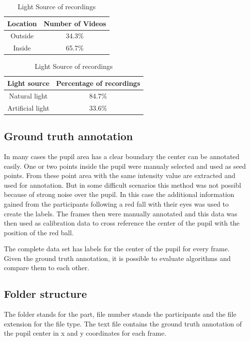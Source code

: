     \begin{table}[h]
      \centering 
      \begin{minipage}{0.7\textwidth}
        \centering
        \begin{tabular}{|c|c|}
          \hline
          Location & Number of Videos \\
          \hline
          Outside & 34.3\% \\
          Inside & 65.7\% \\
          \hline
        \end{tabular}
        \caption{Location of recordings}
        \label{tab:location}
      \end{minipage}\hfill
      \begin{minipage}{0.7\textwidth}
        \centering
        \begin{tabular}{|c|c|}
          \hline
          Light source & Percentage of recordings \\
          \hline
          Natural light & 84.7\% \\
          Artificial light & 33.6\% \\
          \hline
        \end{tabular}
        \caption{Light Source of recordings}
        \label{tab:light_source}
      \end{minipage}
    \end{table}

    \subsection{Ground truth annotation}
    In many cases the pupil area has a clear boundary the center can be annotated easily. One or two points inside the pupil were manualy selected and used as seed points. From these point area with the same intensity value are extracted and used for annotation.  But in some difficult scenarios this method was not possibl because of strong noise over the pupil. In this case the additional information gained from the participants following a red fall with their eyes was used to create the labels. The frames then were manually annotated and this data was then used as calibration data to cross reference the center of the pupil with the position of the red ball. 
    
    The complete data set has labels for the center of the pupil for every frame.
    Given the ground truth annotation, it is possible to evaluate algorithms and compare them to each other.
    \subsection{Folder structure}
    The folder stands for the part, file number stands the participants and the file extension for the file type. The text file contains the ground truth annotation of the pupil center in x and y coordinates for each frame.
    
